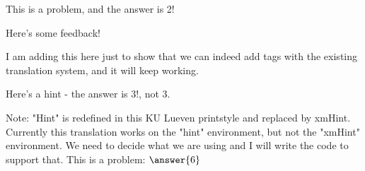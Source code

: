 \documentclass{ximera}
\begin{document}
\begin{question}
    This is a problem, and the answer is 2! %
    \begin{selectAll}
    \end{selectAll}%
    \begin{feedback}
        Here's some feedback!
    \end{feedback}
    \begin{feedback}[correct]
        I am adding this here just to show that we can indeed add tags with the existing translation system, and it will keep working.%
    \end{feedback}
\end{question}

\begin{exercise}
    \begin{hint}
        Here's a hint - the answer is 3!, not 3.
    \end{hint}
    Note: "Hint" is redefined in this KU Lueven printstyle and replaced by xmHint. Currently this translation works on the "hint" environment, but not the "xmHint" environment. We need to decide what we are using and I will write the code to support that.
    This is a problem: $\answer{6}$
\end{exercise}
\end{document}
